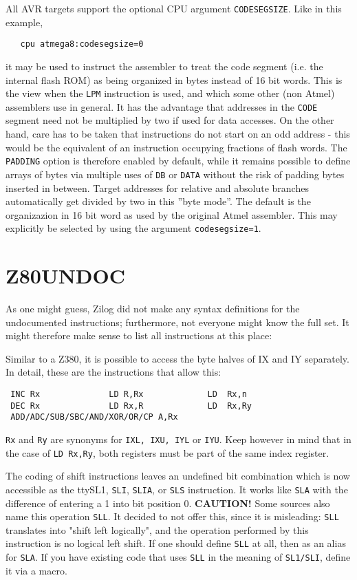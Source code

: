 \documentclass[12pt,twoside]{report}
\newcommand{\bb}[1]{{\bf #1}}
\newcommand{\tty}[1]{{\tt #1}}
\begin{document}
All AVR targets support the optional CPU argument {\tt CODESEGSIZE}.
Like in this example,
\begin{verbatim}
   cpu atmega8:codesegsize=0
\end{verbatim}
it may be used to instruct the assembler to treat the code segment (i.e.
the internal flash ROM) as being organized in bytes instead of 16 bit words.
This is the view when the {\tt LPM} instruction is used, and which some other
(non Atmel) assemblers use in general.  It has the advantage that addresses 
in the {\tt CODE} segment need not be multiplied by two if used for data
accesses.  On the other hand, care has to be taken that instructions do
not start on an odd address - this would be the equivalent of an instruction
occupying fractions of flash words.  The {\tt PADDING} option is therefore
enabled by default, while it remains possible to define arrays of bytes via
multiple uses of {\tt DB} or {\tt DATA} without the risk of padding bytes
inserted in between.  Target addresses for relative and absolute branches 
automatically get divided by two in this ''byte mode''.  The default is the
organizazion in 16 bit word as used by the original Atmel assembler.  This
may explicitly be selected by using the argument \verb!codesegsize=1!.


\section{Z80UNDOC}

As one might guess, Zilog did not make any syntax definitions for the
undocumented instructions; furthermore, not everyone might know the
full set.  It might therefore make sense to list all instructions at
this place:

Similar to a Z380, it is possible to access the byte halves of IX and
IY separately.  In detail, these are the instructions that allow
this:
\begin{verbatim}
 INC Rx              LD R,Rx             LD  Rx,n
 DEC Rx              LD Rx,R             LD  Rx,Ry
 ADD/ADC/SUB/SBC/AND/XOR/OR/CP A,Rx
\end{verbatim}
\tty{Rx} and \tty{Ry} are synonyms for \tty{IXL, IXU, IYL} or \tty{IYU}.
Keep however in mind that in the case of \tty{LD  Rx,Ry}, both registers
must be part of the same index register.

The coding of shift instructions leaves an undefined bit combination which
is now accessible as the tty{SL1}, \tty{SLI}, \tty{SLIA}, or \tty{SLS}
instruction.  It works like \tty{SLA} with the difference of entering a 1
into bit position 0.  \bb{CAUTION!} Some sources also name this operation
\tty{SLL}.  It decided to not offer this, since it is misleading: \tty{SLL}
translates into "shift left logically", and the operation performed by this
instruction is no logical left shift.  If one should define \tty{SLL} at
all, then as an alias for \tty{SLA}.  If you have existing code that uses
\tty{SLL} in the meaning of \tty{SL1/SLI}, define it via a macro.
\end{document}
